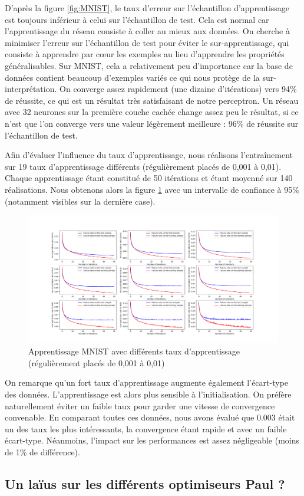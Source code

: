 D'après la figure \ref{fig:MNIST}, le taux d'erreur sur l'échantillon d'apprentissage est toujours inférieur à celui sur l'échantillon de test. Cela est normal car l'apprentissage du réseau consiste à coller au mieux aux données. On cherche à minimiser l'erreur sur l'échantillon de test pour éviter le sur-apprentissage, qui consiste à apprendre par c\oe ur les exemples au lieu d'apprendre les propriétés généralisables. Sur MNIST, cela a relativement peu d'importance car la base de données contient beaucoup d'exemples variés ce qui nous protège de la sur-interprétation. On converge assez rapidement (une dizaine d'itérations) vers 94\% de réussite, ce qui est
un résultat très satisfaisant de notre perceptron. Un réseau avec 32 neurones sur la première couche cachée change assez peu le résultat, si ce n'est que l'on converge vers une valeur légèrement meilleure : 96\% de réussite sur l'échantillon de test.

Afin d'évaluer l'influence du taux d'apprentissage, nous réalisons l'entraînement sur 19 taux d'apprentissage différents (régulièrement placés de 0,001 à 0,01). Chaque apprentissage étant constitué de 50 itérations et étant moyenné sur 140 réalisations. Nous obtenons alors la figure \ref{fig:MNIST_difLR} avec un intervalle de confiance à 95\% (notamment visibles sur la dernière case).

\begin{figure}[ht]
 \centering
 \includegraphics[width=\textwidth]{img/MNIST_difLR.png}
 \caption{Apprentissage MNIST avec différents taux d'apprentissage (régulièrement placés de 0,001 à 0,01)}
 \label{fig:MNIST_difLR}
\end{figure}

On remarque qu'un fort taux d'apprentissage augmente également l'écart-type des données. L'apprentissage est alors plus sensible à l'initialisation. On préfère naturellement éviter un faible taux pour garder une vitesse de convergence convenable. En comparant toutes ces données, nous avons évalué que 0.003 était un des taux les plus intéressants, la convergence étant rapide et avec un faible écart-type. Néanmoins, l'impact sur les performances est assez négligeable (moins de 1\% de différence).


\subsection{Un laïus sur les différents optimiseurs Paul ?}

















